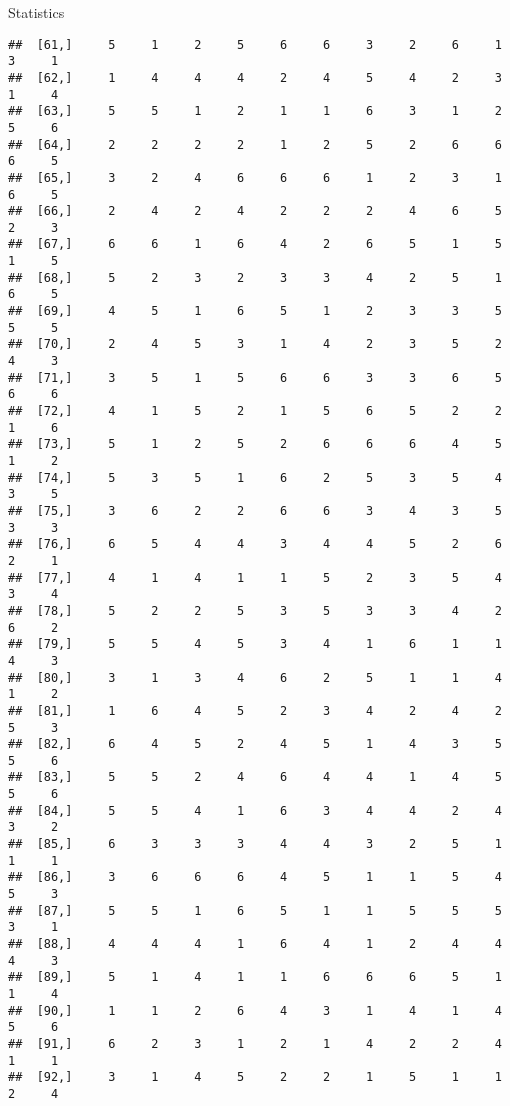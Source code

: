 \documentclass[
  ignorenonframetext,
]{beamer}
\begin{document}
\begin{frame}[fragile]{Statistics}
\begin{verbatim}
##  [61,]     5     1     2     5     6     6     3     2     6     1     3     1
##  [62,]     1     4     4     4     2     4     5     4     2     3     1     4
##  [63,]     5     5     1     2     1     1     6     3     1     2     5     6
##  [64,]     2     2     2     2     1     2     5     2     6     6     6     5
##  [65,]     3     2     4     6     6     6     1     2     3     1     6     5
##  [66,]     2     4     2     4     2     2     2     4     6     5     2     3
##  [67,]     6     6     1     6     4     2     6     5     1     5     1     5
##  [68,]     5     2     3     2     3     3     4     2     5     1     6     5
##  [69,]     4     5     1     6     5     1     2     3     3     5     5     5
##  [70,]     2     4     5     3     1     4     2     3     5     2     4     3
##  [71,]     3     5     1     5     6     6     3     3     6     5     6     6
##  [72,]     4     1     5     2     1     5     6     5     2     2     1     6
##  [73,]     5     1     2     5     2     6     6     6     4     5     1     2
##  [74,]     5     3     5     1     6     2     5     3     5     4     3     5
##  [75,]     3     6     2     2     6     6     3     4     3     5     3     3
##  [76,]     6     5     4     4     3     4     4     5     2     6     2     1
##  [77,]     4     1     4     1     1     5     2     3     5     4     3     4
##  [78,]     5     2     2     5     3     5     3     3     4     2     6     2
##  [79,]     5     5     4     5     3     4     1     6     1     1     4     3
##  [80,]     3     1     3     4     6     2     5     1     1     4     1     2
##  [81,]     1     6     4     5     2     3     4     2     4     2     5     3
##  [82,]     6     4     5     2     4     5     1     4     3     5     5     6
##  [83,]     5     5     2     4     6     4     4     1     4     5     5     6
##  [84,]     5     5     4     1     6     3     4     4     2     4     3     2
##  [85,]     6     3     3     3     4     4     3     2     5     1     1     1
##  [86,]     3     6     6     6     4     5     1     1     5     4     5     3
##  [87,]     5     5     1     6     5     1     1     5     5     5     3     1
##  [88,]     4     4     4     1     6     4     1     2     4     4     4     3
##  [89,]     5     1     4     1     1     6     6     6     5     1     1     4
##  [90,]     1     1     2     6     4     3     1     4     1     4     5     6
##  [91,]     6     2     3     1     2     1     4     2     2     4     1     1
##  [92,]     3     1     4     5     2     2     1     5     1     1     2     4

\end{verbatim}
\end{frame}
\end{document}
